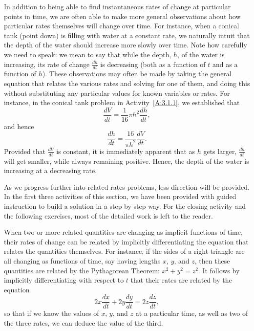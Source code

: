 
In addition to being able to find instantaneous rates of change at particular points in time, we are often able to make more general observations about how particular rates themselves will change over time.  For instance, when a conical tank (point down) is filling with water at a constant rate, we naturally intuit that the depth of the water should increase more slowly over time.  Note how carefully we need to speak:  we mean to say that while the depth, $h$, of the water is increasing, its rate of change $\frac{dh}{dt}$ is decreasing (both as a function of $t$ and as a function of $h$).  These observations may often be made by taking the general equation that relates the various rates and solving for one of them, and doing this without substituting any particular values for known variables or rates.  For instance, in the conical tank problem in Activity~\ref{A:3.1.1}, we established that 
$$\frac{dV}{dt} = \frac{1}{16} \pi h^2 \frac{dh}{dt},$$
and hence
$$\frac{dh}{dt} = \frac{16}{\pi h^2} \frac{dV}{dt}.$$
Provided that $\frac{dV}{dt}$ is constant, it is immediately apparent that as $h$ gets larger, $\frac{dh}{dt}$ will get smaller, while always remaining positive.  Hence, the depth of the water is increasing at a decreasing rate.


As we progress further into related rates problems, less direction will be provided.  In the first three activities of this section, we have been provided with guided instruction to build a solution in a step by step way.  For the closing activity and the following exercises, most of the detailed work is left to the reader.


\begin{summary}
\item When two or more related quantities are changing as implicit functions of time, their rates of change can be related by implicitly differentiating the equation that relates the quantities themselves.  For instance, if the sides of a right triangle are all changing as functions of time, say having lengths $x$, $y$, and $z$, then these quantities are related by the Pythagorean Theorem: $x^2 + y^2 = z^2$.  It follows by implicitly differentiating with respect to $t$ that their rates are related by the equation
$$2x \frac{dx}{dt} + 2y\frac{dy}{dt} = 2z \frac{dz}{dt},$$ 
so that if we know the values of $x$, $y$, and $z$ at a particular time, as well as two of the three rates, we can deduce the value of the third.
\end{summary}

\clearpage

 

\cleardoublepage